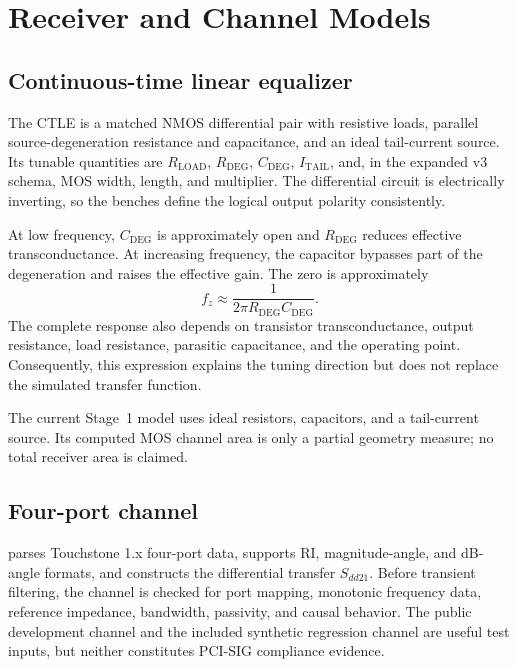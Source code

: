 \chapter{Receiver and Channel Models}

\section{Continuous-time linear equalizer}

The CTLE is a matched NMOS differential pair with resistive loads, parallel
source-degeneration resistance and capacitance, and an ideal tail-current
source. Its tunable quantities are $R_{\mathrm{LOAD}}$, $R_{\mathrm{DEG}}$,
$C_{\mathrm{DEG}}$, $I_{\mathrm{TAIL}}$, and, in the expanded v3 schema, MOS
width, length, and multiplier. The differential circuit is electrically
inverting, so the benches define the logical output polarity consistently.

At low frequency, $C_{\mathrm{DEG}}$ is approximately open and
$R_{\mathrm{DEG}}$ reduces effective transconductance. At increasing frequency,
the capacitor bypasses part of the degeneration and raises the effective gain.
The zero is approximately
\begin{equation}
  f_z \approx \frac{1}{2\pi R_{\mathrm{DEG}}C_{\mathrm{DEG}}}.
\end{equation}
The complete response also depends on transistor transconductance, output
resistance, load resistance, parasitic capacitance, and the operating point.
Consequently, this expression explains the tuning direction but does not replace
the simulated transfer function.

The current Stage~1 model uses ideal resistors, capacitors, and a tail-current
source. Its computed MOS channel area is only a partial geometry measure; no
total receiver area is claimed.

\section{Four-port channel}

 parses Touchstone 1.x four-port data, supports
RI, magnitude-angle, and dB-angle formats, and constructs the differential
transfer $S_{dd21}$. Before transient filtering, the channel is checked for port
mapping, monotonic frequency data, reference impedance, bandwidth, passivity,
and causal behavior. The public development channel and the included synthetic
regression channel are useful test inputs, but neither constitutes PCI-SIG
compliance evidence.

